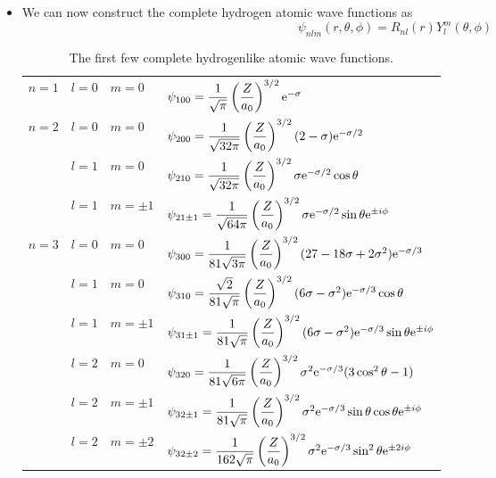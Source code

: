 \documentclass[../notes.tex]{subfiles}
\begin{document}
\begin{itemize}
\begin{itemize}
    \end{itemize}
    \item We can now construct the complete hydrogen atomic wave functions as
    \begin{equation*}
        \psi_{nlm}(r,\theta,\phi) = R_{nl}(r)Y_l^m(\theta,\phi)
    \end{equation*}
    \begin{table}[h!]
        \centering
        \small
        \renewcommand{\arraystretch}{2.5}
        \begin{tabular}{llll}
            \toprule
            $n=1$ & $l=0$ & $m=0$ & $\psi_{100}=\dfrac{1}{\sqrt{\pi}}\left( \dfrac{Z}{a_0} \right)^{3/2}\e[-\sigma]$\\
            $n=2$ & $l=0$ & $m=0$ & $\psi_{200}=\dfrac{1}{\sqrt{32\pi}}\left( \dfrac{Z}{a_0} \right)^{3/2}(2-\sigma)\e[-\sigma/2]$\\
                  & $l=1$ & $m=0$ & $\psi_{210}=\dfrac{1}{\sqrt{32\pi}}\left( \dfrac{Z}{a_0} \right)^{3/2}\sigma\e[-\sigma/2]\cos\theta$\\
                  & $l=1$ & $m=\pm 1$ & $\psi_{21\pm 1}=\dfrac{1}{\sqrt{64\pi}}\left( \dfrac{Z}{a_0} \right)^{3/2}\sigma\e[-\sigma/2]\sin\theta\e[\pm i\phi]$\\
            $n=3$ & $l=0$ & $m=0$ & $\psi_{300}=\dfrac{1}{81\sqrt{3\pi}}\left( \dfrac{Z}{a_0} \right)^{3/2}(27-18\sigma+2\sigma^2)\e[-\sigma/3]$\\
                  & $l=1$ & $m=0$ & $\psi_{310}=\dfrac{\sqrt{2}}{81\sqrt{\pi}}\left( \dfrac{Z}{a_0} \right)^{3/2}(6\sigma-\sigma^2)\e[-\sigma/3]\cos\theta$\\
                  & $l=1$ & $m=\pm 1$ & $\psi_{31\pm 1}=\dfrac{1}{81\sqrt{\pi}}\left( \dfrac{Z}{a_0} \right)^{3/2}(6\sigma-\sigma^2)\e[-\sigma/3]\sin\theta\e[\pm i\phi]$\\
                  & $l=2$ & $m=0$ & $\psi_{320}=\dfrac{1}{81\sqrt{6\pi}}\left( \dfrac{Z}{a_0} \right)^{3/2}\sigma^2\e[-\sigma/3](3\cos^2\theta-1)$\\
                  & $l=2$ & $m=\pm 1$ & $\psi_{32\pm 1}=\dfrac{1}{81\sqrt{\pi}}\left( \dfrac{Z}{a_0} \right)^{3/2}\sigma^2\e[-\sigma/3]\sin\theta\cos\theta\e[\pm i\phi]$\\
                  & $l=2$ & $m=\pm 2$ & $\psi_{32\pm 2}=\dfrac{1}{162\sqrt{\pi}}\left( \dfrac{Z}{a_0} \right)^{3/2}\sigma^2\e[-\sigma/3]\sin^2\theta\e[\pm 2i\phi]$\\
            \bottomrule
        \end{tabular}
        \caption{The first few complete hydrogenlike atomic wave functions.}

\end{table}
\end{itemize}
\end{document}

